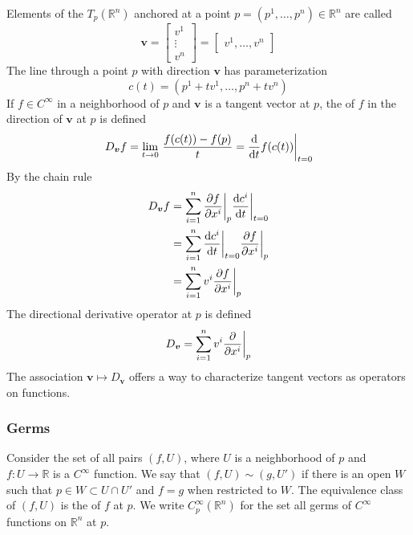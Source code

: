 Elements of the  \(T_p (\mathbb{R}^n)\) anchored at a point \(p = (p^1, \dots, p^n) \in \mathbb{R}^n\) are called 
%
\begin{equation}
    \bm{v} 
    = 
    \begin{bmatrix}
        v^1 \\ \vdots \\ v^n    
    \end{bmatrix}  
    =
    \begin{bmatrix}
        v^1, \dots, v^n    
    \end{bmatrix}
\end{equation}
%
The line through a point \(p\) with direction \(\bm{v}\) has parameterization
%
\begin{equation}
    c(t) = \left( p^1 + t v^1, \dots, p^n + t v^n \right) 
\end{equation}
%
If \(f \in C^\infty\) in a neighborhood of \(p\) and \(\bm{v}\) is a tangent vector at \(p\), the  of \(f\) in the direction of \(\bm{v}\) at \(p\) is defined
%
\begin{equation}
   D_{\bm{v}} f 
   = 
   \lim_{t\rightarrow 0}\, \frac{f(c(t)) - f(p)}{t} 
   = 
   \evalat[\bigg]{\dv{}{t} f(c(t))}{t=0}
\end{equation}
%
By the chain rule 
%
\begin{align}
   D_{\bm{v}} f &= \sum_{i=1}^{n} \evalat[\bigg]{\pdv{f}{x^i}}{p} \evalat[\bigg]{\dv{c^i}{t}}{t=0} \\
   &= \sum_{i=1}^{n} \evalat[\bigg]{\dv{c^i}{t}}{t=0} \evalat[\bigg]{\pdv{f}{x^i}}{p}  \\
   &= \sum_{i=1}^{n} v^i \evalat[\bigg]{\pdv{f}{x^i}}{p}\label{eqn:chainrule}  \\
\end{align}
%
The directional derivative operator at \(p\) is defined
%
\begin{equation}
    D_{\bm{v}} = \sum_{i=1}^{n} v^i \evalat[\bigg]{\pdv{}{x^i}}{p}
\end{equation}
%
The association \(\bm{v} \mapsto D_{\bm{v}}\) offers a way to characterize tangent vectors as operators on functions.

\subsubsection{Germs}

Consider the set of all pairs \((f, U)\), where \(U\) is a neighborhood of \(p\) and \(f\colon U \rightarrow \mathbb{R}\) is a \(C^\infty\) function. 
%
We say that \((f, U) \sim (g, U')\) if there is an open \(W\) such that \(p \in W \subset U \cap U'\) and \(f = g\) when restricted to \(W\).
%
The equivalence class of \((f, U)\) is the  of \(f\) at \(p\).
%
We write \(C_p^\infty(\mathbb{R}^n)\) for the set all germs of \(C^\infty\) functions on \(\mathbb{R}^n\) at \(p\).

